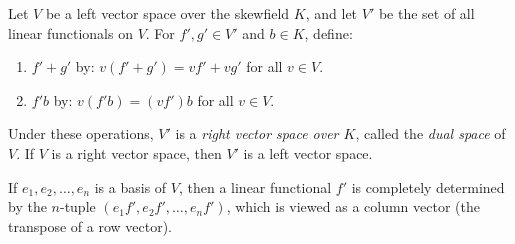 Let $V$ be a left vector space over the skewfield $K$, and let $V'$ be the set of all linear functionals on $V$. For $f', g' \in V'$ and $b \in K$, define:

\begin{enumerate}
\item[(i)] $f' + g'$ by: $v(f' + g') = vf' + vg'$ for all $v \in V$.
\item[(ii)] $f'b$ by: $v(f'b) = (vf')b$ for all $v \in V$.
\end{enumerate}

Under these operations, $V'$ is a \textit{right vector space over $K$}, called the \textit{dual space} of $V$. If $V$ is a right vector space, then $V'$ is a left vector space.

If $e_1, e_2, \dots, e_n$ is a basis of $V$, then a linear functional $f'$ is completely determined by the $n$-tuple $(e_1 f', e_2 f', \dots, e_n f')$, which is viewed as a column vector (the transpose of a row vector).
